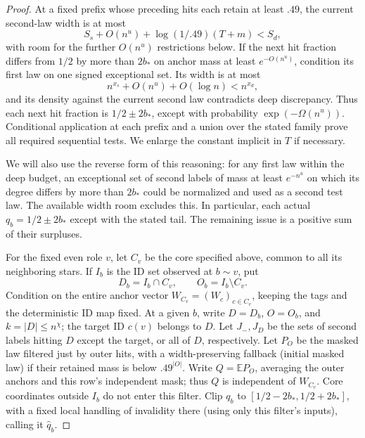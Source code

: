\begin{proof}
At a fixed prefix whose preceding hits each retain at least \(.49\), the current second-law width is at most
\[
 S_s+O(n^u)+\log(1/.49)(T+m)<S_d,
\]
with room for the further \(O(n^u)\) restrictions below. If the next hit fraction differs from \(1/2\) by more than \(2b_*\) on anchor mass at least \(e^{-O(n^u)}\), condition its first law on one signed exceptional set. Its width is at most
\[
 n^{x_s}+O(n^u)+O(\log n)<n^{x_d},
\]
and its density against the current second law contradicts deep discrepancy. Thus each next hit fraction is \(1/2\pm2b_*\), except with probability \(\exp(-\Omega(n^u))\). Conditional application at each prefix and a union over the stated family prove all required sequential tests. We enlarge the constant implicit in \(T\) if necessary.

We will also use the reverse form of this reasoning: for any first law within the deep budget, an exceptional set of second labels of mass at least \(e^{-n^u}\) on which its degree differs by more than \(2b_*\) could be normalized and used as a second test law. The available width room excludes this. In particular, each actual \(q_b=1/2\pm2b_*\) except with the stated tail. The remaining issue is a positive sum of their surpluses.

For the fixed even role \(v\), let \(C_v\) be the core specified above, common to all its neighboring stars. If \(I_b\) is the ID set observed at \(b\sim v\), put
\[
 D_b=I_b\cap C_v,\qquad O_b=I_b\setminus C_v.
\]
Condition on the entire anchor vector \(W_{C_v}=(W_c)_{c\in C_v}\), keeping the tags and the deterministic ID map fixed. At a given \(b\), write \(D=D_b\), \(O=O_b\), and \(k=|D|\le n^\chi\); the target ID \(c(v)\) belongs to \(D\). Let \(J_-,J_D\) be the sets of second labels hitting \(D\) except the target, or all of \(D\), respectively. Let \(P_O\) be the masked law filtered just by outer hits, with a width-preserving fallback (initial masked law) if their retained mass is below \(.49^{|O|}\). Write \(Q=\mathbb E P_O\), averaging the outer anchors and this row's independent mask; thus \(Q\) is independent of \(W_{C_v}\). Core coordinates outside \(I_b\) do not enter this filter. Clip \(q_b\) to \([1/2-2b_*,1/2+2b_*]\), with a fixed local handling of invalidity there (using only this filter's inputs), calling it \(\widehat q_b\).


\end{proof}

